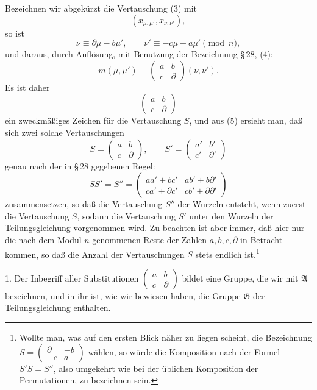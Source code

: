 \documentclass[11pt]{article}
\begin{document}
Bezeichnen wir abgekürzt die Vertauschung (3) mit
\[
 (x_{\mu,\mu'},x_{\nu,\nu'}),
\]
so ist
\[
 \nu\equiv\partial\mu-b\mu',
 \qquad \nu'\equiv-c\mu+a\mu'\pmod n,
\]
und daraus, durch Auflösung, mit Benutzung der Bezeichnung \S\,28, (4):
\begin{equation}
 m(\mu,\mu')\equiv
 \begin{pmatrix}a&b\\ c&\partial\end{pmatrix}(\nu,\nu').
\tag{5}
\end{equation}
Es ist daher
\begin{equation}
 \begin{pmatrix}a&b\\ c&\partial\end{pmatrix}
\tag{6}
\end{equation}
ein zweckmäßiges Zeichen für die Vertauschung $S$, und aus (5) ersieht man, daß sich
zwei solche Vertauschungen
\[
 S=\begin{pmatrix}a&b\\ c&\partial\end{pmatrix},
 \qquad
 S'=\begin{pmatrix}a'&b'\\ c'&\partial'\end{pmatrix}
\]
genau nach der in \S\,28 gegebenen Regel:
\begin{equation}
 SS'=S''=
 \begin{pmatrix}
 aa'+bc'&ab'+b\partial'\\
 ca'+\partial c'&cb'+\partial\partial'
 \end{pmatrix}
\tag{7}
\end{equation}
zusammensetzen, so daß die Vertauschung $S''$ der Wurzeln entsteht, wenn zuerst die
Vertauschung $S$, sodann die Vertauschung $S'$ unter den Wurzeln der Teilungsgleichung
vorgenommen wird. Zu beachten ist aber immer, daß hier nur die nach dem Modul $n$
genommenen Reste der Zahlen $a,b,c,\partial$ in Betracht kommen, so daß die Anzahl der
Vertauschungen $S$ stets endlich ist.\footnote{Wollte man, was auf den ersten Blick näher zu liegen scheint, die Bezeichnung
$S=\begin{pmatrix}\partial&-b\\ -c&a\end{pmatrix}$ wählen, so würde die Komposition nach der Formel
$S'S=S''$, also umgekehrt wie bei der üblichen Komposition der Permutationen, zu bezeichnen sein.}

1. Der Inbegriff aller Substitutionen $\begin{pmatrix}a&b\\ c&\partial\end{pmatrix}$ bildet eine
Gruppe, die wir mit $\mathfrak A$ bezeichnen, und in ihr ist, wie wir bewiesen haben, die
Gruppe $\mathfrak G$ der Teilungsgleichung enthalten.
\end{document}
